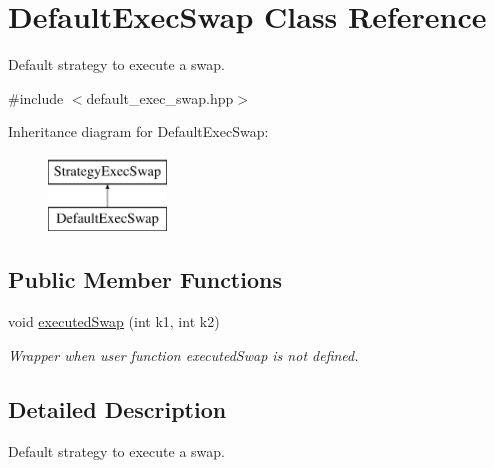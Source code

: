 \hypertarget{classDefaultExecSwap}{\section{\-Default\-Exec\-Swap \-Class \-Reference}
\label{classDefaultExecSwap}
}


\-Default strategy to execute a swap.  




{\ttfamily \#include $<$default\-\_\-exec\-\_\-swap.\-hpp$>$}

\-Inheritance diagram for \-Default\-Exec\-Swap\-:\begin{figure}[H]
\begin{center}
\leavevmode
\includegraphics[height=2.000000cm]{classDefaultExecSwap}
\end{center}
\end{figure}
\subsection*{\-Public \-Member \-Functions}
\begin{DoxyCompactItemize}
\item 
void \hyperlink{classDefaultExecSwap_a97353521524f73e025572e1cab5b6b14}{executed\-Swap} (int k1, int k2)
\begin{DoxyCompactList}\small\item\em \-Wrapper when user function executed\-Swap is not defined. \end{DoxyCompactList}\end{DoxyCompactItemize}


\subsection{\-Detailed \-Description}
\-Default strategy to execute a swap. 

